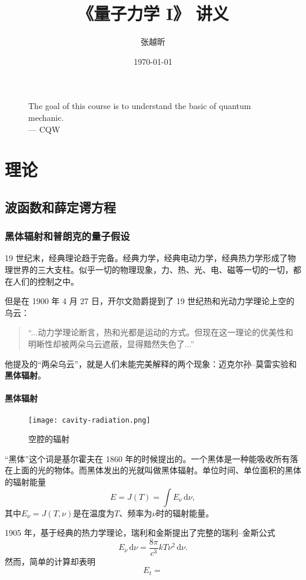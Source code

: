 \documentclass[zihao=-4]{ctexbook}
\title{《量子力学 I》 讲义}
\author{\kaishu 张越昕}
\date{\kaishu \today}
\newcommand{\mr}{\mathrm}
\begin{document}
\frontmatter
\maketitle
\begin{figure}
\centering
\huge The goal of this course is to understand the basic of quantum mechanic.\\
\raggedleft
\Large --- CQW
\end{figure}
\clearpage 
{}
\tableofcontents

\mainmatter
\part{理\qquad 论}
\chapter{波函数和薛定谔方程}
\section{黑体辐射和普朗克的量子假设}
19 世纪末，经典理论趋于完备。经典力学，经典电动力学，经典热力学形成了物理世界的三大支柱。似乎一切的物理现象，力、热、光、电、磁等一切的一切，都在人们的控制之中。

但是在 1900 年 4 月 27 日，开尔文勋爵提到了 19 世纪热和光动力学理论上空的乌云：
\begin{quote}\kaishu
	“...动力学理论断言，热和光都是运动的方式。但现在这一理论的优美性和明晰性却被两朵乌云遮蔽，显得黯然失色了...”
\end{quote}
他提及的“两朵乌云”，就是人们未能完美解释的两个现象：迈克尔孙--莫雷实验和\textbf{黑体辐射}。

\subsection{黑体辐射}
\begin{figure}[H]
\centering
\texttt{[image: cavity-radiation.png]}
\caption{空腔的辐射}
\end{figure}
“黑体”这个词是基尔霍夫在 1860 年的时候提出的。一个黑体是一种能吸收所有落在上面的光的物体。而黑体发出的光就叫做黑体辐射。单位时间、单位面积的黑体的辐射能量
\begin{equation}
	E=J(T)=\int E_\nu\, \mr{d}\nu,
\end{equation}
其中$E_\nu=J(T,\nu)$是在温度为$T$、频率为$\nu$时的辐射能量。

1905 年，基于经典的热力学理论，瑞利和金斯提出了完整的瑞利--金斯公式
\begin{equation}
	E_\nu\,\mr{d}\nu =\frac{8\pi}{c^3}kT\nu^2\,\mr{d}\nu.
\end{equation}
然而，简单的计算却表明
\begin{equation}
	E_t=
\end{equation}
\end{document}
